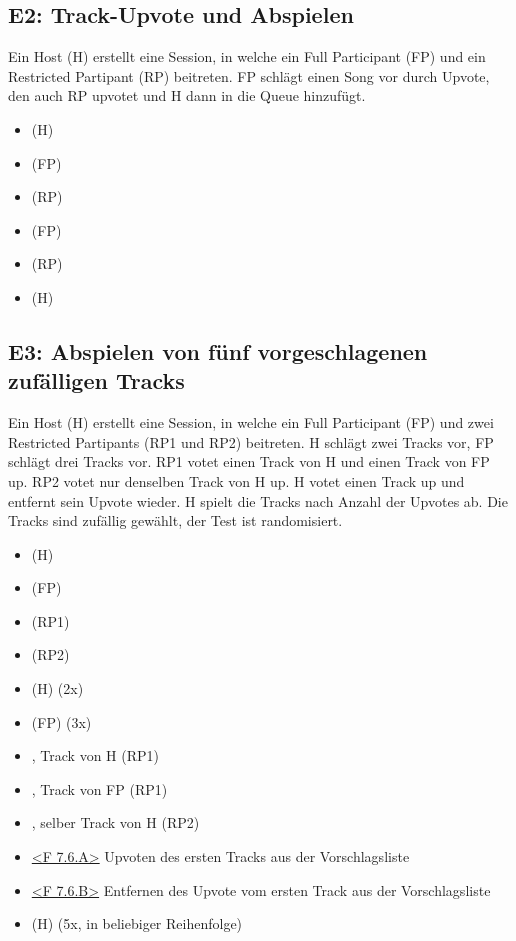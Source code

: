 \documentclass[oneside, ngerman]{sdqtechreport}
\begin{document}
\subsection{E2: Track-Upvote und Abspielen}
\label{subsec:Tests:ErweiterteTestszenarien:E1}
Ein Host (H) erstellt eine Session, in welche ein Full Participant (FP) und ein Restricted Partipant (RP) beitreten. FP schlägt einen Song vor durch Upvote, den auch RP upvotet und H dann in die Queue hinzufügt.
\begin{itemize}
    \item \gOne (H)
    \item \gTwo (FP)
    \item \gThree (RP)
    \item \gFour (FP)
    \item \gSix (RP)
    \item \gSeven (H)
\end{itemize}


\subsection{E3: Abspielen von fünf vorgeschlagenen zufälligen Tracks}
\label{subsec:Tests:ErweiterteTestszenarien:E3}
Ein Host (H) erstellt eine Session, in welche ein Full Participant (FP) und zwei Restricted Partipants (RP1 und RP2) beitreten. H schlägt zwei Tracks vor, FP schlägt drei Tracks vor. RP1 votet einen Track von H und einen Track von FP up. RP2 votet nur denselben Track von H up. H votet einen Track up und entfernt sein Upvote wieder. H spielt die Tracks nach Anzahl der Upvotes ab. Die Tracks sind zufällig gewählt, der Test ist randomisiert.
\begin{itemize}
    \item \gOne (H)
    \item \gTwo (FP)
    \item \gThree (RP1)
    \item \gThree (RP2)
    \item \gFive (H) (2x)
    \item \gFour (FP) (3x)
    \item \gSix, Track von H (RP1)
    \item \gSix, Track von FP (RP1)
    \item \gSix, selber Track von H (RP2)
    \item \hyperlink{<F 7.6.A>}{<F 7.6.A>} Upvoten des ersten Tracks aus der Vorschlagsliste
    \item \hyperlink{<F 7.6.B>}{<F 7.6.B>} Entfernen des Upvote vom ersten Track aus der Vorschlagsliste
    \item \gSeven (H) (5x, in beliebiger Reihenfolge)
\end{itemize}
\end{document}
